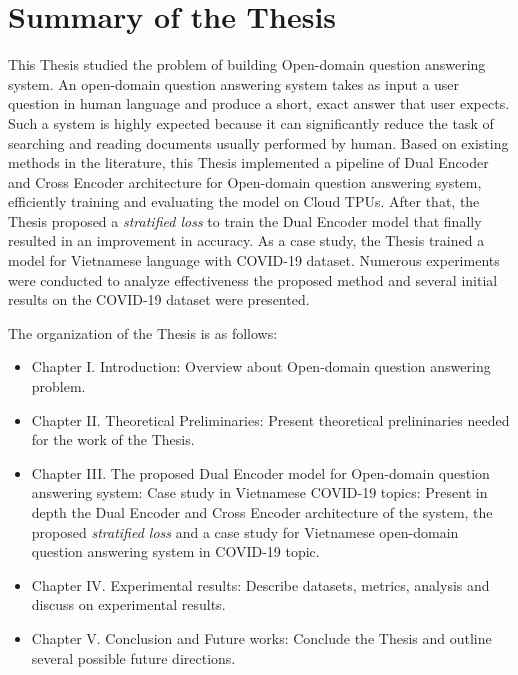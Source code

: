 \documentclass[12pt, sort&compress]{report}
\begin{document}
\chapter*{Summary of the Thesis}
This Thesis studied the problem of building Open-domain question answering system. An open-domain question answering system takes as input a user question in human language and produce a short, exact answer that user expects. Such a system is highly expected because it can significantly reduce the task of searching and reading documents usually performed by human. Based on existing methods in the literature, this Thesis implemented a pipeline of Dual Encoder and Cross Encoder architecture for Open-domain question answering system, efficiently training and evaluating the model on Cloud TPUs. After that, the Thesis proposed a \textit{stratified loss} to train the Dual Encoder model that finally resulted in an improvement in accuracy. As a case study, the Thesis trained a model for Vietnamese language with COVID-19 dataset. Numerous experiments were conducted to analyze effectiveness the proposed method and several initial results on the COVID-19 dataset were presented.
\par The organization of the Thesis is as follows:
\begin{itemize}
	\item Chapter I. Introduction: Overview about Open-domain question answering problem.
	\item Chapter II. Theoretical Preliminaries: Present theoretical prelininaries needed for the work of the Thesis.
	\item Chapter III. The proposed Dual Encoder model for Open-domain question answering system: Case study in Vietnamese COVID-19 topics: Present in depth the Dual Encoder and Cross Encoder architecture of the system, the proposed \textit{stratified loss} and a case study for Vietnamese open-domain question answering system in COVID-19 topic.
	\item Chapter IV. Experimental results: Describe datasets, metrics, analysis and discuss on experimental results.
	\item Chapter V. Conclusion and Future works: Conclude the Thesis and outline several possible future directions.
\end{itemize}
\tableofcontents
%
\newpage
\renewcommand{\arraystretch}{1.25}
\end{document}
